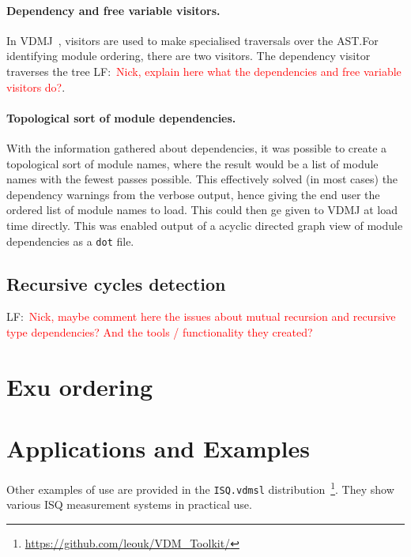 \documentclass[runningheads,a4paper]{llncs}
\newcommand{\lfcomment}[1]{LF:~\textcolor{red}{#1}}
\begin{document}
\paragraph*{Dependency and free variable visitors.}
%
In VDMJ~\cite{Battle09}, visitors are used to make specialised traversals over the AST.\@ For identifying module ordering, there are two visitors. The dependency visitor traverses the tree \lfcomment{Nick, explain here what the dependencies and free variable visitors do?}. 

\paragraph*{Topological sort of module dependencies.}
%
With the information gathered about dependencies, it was possible to create a topological sort of module names, where the result would be a list of module names with the fewest passes possible. This effectively solved (in most cases) the dependency warnings from the verbose output, hence giving the end user the ordered list of module names to load. This could then ge given to VDMJ at load time directly. This was enabled output of a acyclic directed graph view of module dependencies as a \texttt{dot} file.    

\subsection{Recursive cycles detection}

\lfcomment{Nick, maybe comment here the issues about mutual recursion and recursive type dependencies? And the tools / functionality they created?}

\section{Exu ordering}\label{sec:exu}


\section{Applications and Examples}\label{sec:Examples}


Other examples of use are provided in the \texttt{ISQ.vdmsl} distribution~\footnote{\url{https://github.com/leouk/VDM_Toolkit/}}. They show various ISQ measurement systems in practical use.

\end{document}

